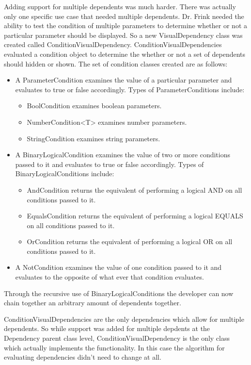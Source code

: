 Adding support for multiple dependents was much harder. There was actually only one specific use case that needed multiple dependents. Dr.
Frink needed the ability to test the condition of multiple parameters to determine whether or not a particular parameter should be displayed.
So a new VisualDependency class was created called ConditionVisualDependency. ConditionVisualDependencies evaluated a condition object to
determine the whether or not a set of dependents should hidden or shown. The set of condition classes created are as follows:
\begin{itemize}
	\item A ParameterCondition examines the value of a particular parameter and evaluates to true or false accordingly. Types of ParameterConditions include:
	\begin{itemize}
		\item BoolCondition examines boolean parameters.
		\item NumberCondition<T> examines number parameters.
		\item StringCondition examines string parameters.
	\end{itemize}
	\item A BinaryLogicalCondition examines the value of two or more conditions passed to it and evaluates to true or false accordingly. Types of BinaryLogicalConditions include:
	\begin{itemize}
		\item AndCondition returns the equivalent of performing a logical AND on all conditions passed to it.
		\item EqualsCondition returns the equivalent of performing a logical EQUALS on all conditions passed to it.
		\item OrCondition returns the equivalent of performing a logical OR on all conditions passed to it.
	\end{itemize}
	\item A NotCondition examines the value of one condition passed to it and evaluates to the opposite of what ever that condition evaluates.
\end{itemize}
Through the recursive use of BinaryLogicalConditions the developer can now chain together an arbitrary amount of dependents together.

ConditionVisualDependencies are the only dependencies which allow for multiple dependents. So while support was added for multiple depdents at the
Dependency parent class level, ConditionVisualDependency is the only class which actually implements the functionality. In this case the algorithm
for evaluating dependencies didn't need to change at all.

